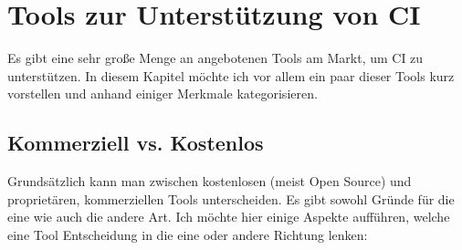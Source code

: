 \pagebreak

\chapter{Tools zur Unterstützung von CI}
Es gibt eine sehr große Menge an angebotenen Tools am Markt, um CI zu unterstützen. In diesem Kapitel möchte ich vor allem ein paar dieser Tools kurz vorstellen und anhand einiger Merkmale kategorisieren.
\section{Kommerziell vs. Kostenlos}
Grundsätzlich kann man zwischen kostenlosen (meist Open Source) und proprietären, kommerziellen Tools unterscheiden. Es gibt sowohl Gründe für die eine wie auch die andere Art. Ich möchte hier einige Aspekte aufführen, welche eine Tool Entscheidung in die eine oder andere Richtung lenken:

